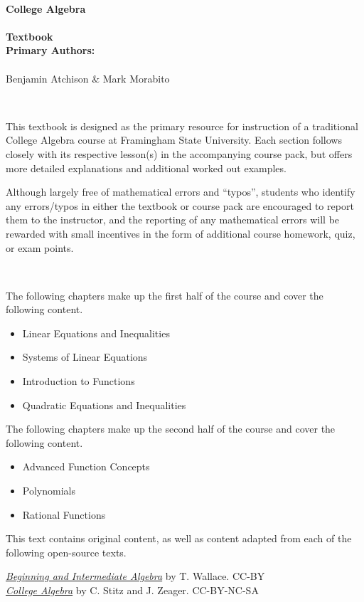 \documentclass[12pt]{book}
\theoremstyle{definition}
\begin{document}
\thispagestyle{empty}
\ \vspace{2in}
\begin{center}
{\bf \Huge College Algebra\\
\ \\
Textbook}\\
\vspace{0.5in}
\large {\bf Primary Authors:}\\
\ \\
 Benjamin Atchison
\& Mark Morabito
\end{center}
\newpage
\thispagestyle{empty}
\hfill \doclicenseImage[imagewidth=5em]\\
\par
\normalsize This textbook is designed as the primary resource for instruction of a traditional College Algebra course at
Framingham State University. 
Each section follows closely with its respective lesson(s) in the accompanying course pack, but offers more detailed explanations and additional worked out examples.\\
\par
Although largely free of mathematical errors and ``typos'', students who identify any errors/typos in either the textbook or course pack are encouraged to report them to the instructor, and the reporting of any mathematical errors will be rewarded with small incentives in the form of additional course homework, quiz, or exam points.
\par
\hrulefill
\par
\ \par
The following chapters make up the first half of the course and cover the following content.
\begin{itemize}
	\item Linear Equations and Inequalities
	\item Systems of Linear Equations
	\item Introduction to Functions
	\item Quadratic Equations and Inequalities
\end{itemize}
The following chapters make up the second half of the course and cover the following content.
\begin{itemize}
	\item Advanced Function Concepts
	\item Polynomials
	\item Rational Functions
\end{itemize}
\vfill
This text contains original content, as well as content adapted from each of the following open-source texts.\par
\href{http://www.wallace.ccfaculty.org/book/book.html}{\it{Beginning and Intermediate Algebra}} by T. Wallace. CC-BY\\
\href{http://www.stitz-zeager.com}{\it{College Algebra}} by C. Stitz and J. Zeager. CC-BY-NC-SA 
\newpage
\end{document}
